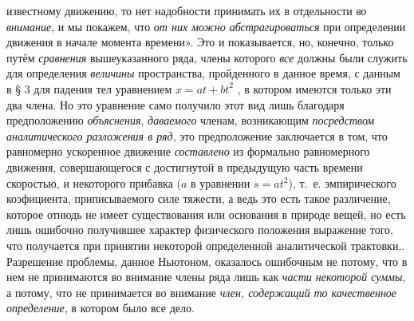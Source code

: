 {{{известному движению, то нет надобности принимать} их в
отдельности {\em во внимание}, и мы покажем, что
{\em от них можно абстрагироваться} при определении движения в
начале момента времени». Это и показывается, но, конечно, только путём
{\em сравнения} вышеуказанного ряда, члены которого {\em все} должны были
служить для определения {\em величины}
пространства, пройденного в данное время, с данным в § 3 для
падения тел уравнением $x=\mathit{at}+\mathit{bt}^2$ , в
котором имеются только эти два члена. Но это уравнение само получило этот
вид лишь благодаря предположению {\em объяснения}, {\em даваемого} членам,
возникающим {\em посредством аналитического разложения в ряд},
это предположение заключается в том, что равномерно ускоренное движение
{\em составлено} из формально равномерного движения, совершающегося
с достигнутой в предыдущую часть времени скоростью, и некоторого прибавка
($a$ в уравнении $s=at^2$), т.~е. эмпирического коэфициента,
приписываемого силе тяжести, а ведь это есть такое различение, которое
отнюдь не имеет существования или основания в природе вещей, но есть лишь
ошибочно получившее характер физического положения выражение того, что
получается при принятии некоторой определенной аналитической трактовки.}.
Разрешение проблемы, данное Ньютоном, оказалось ошибочным не потому, что в
нем не принимаются во внимание члены ряда лишь как
{\em части некоторой суммы}, а потому, что не
принимается во внимание {\em член, содержащий то
качественное определение}, в котором было все дело.

}
